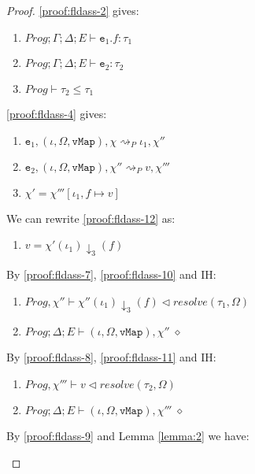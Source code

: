 \begin{proof}
\ref{proof:fldass-2} gives:
\begin{enumerate}[label=\arabic*), resume]
    \item \label{proof:fldass-7} $Prog; \Gamma; \Delta; E \vdash \texttt{e}_1.f : \tau_1$
    \item \label{proof:fldass-8} $Prog; \Gamma; \Delta; E \vdash \texttt{e}_2 : \tau_2$
    \item \label{proof:fldass-9} $Prog \vdash \tau_2 \leq \tau_1$
\end{enumerate}
\ref{proof:fldass-4} gives:
\begin{enumerate}[label=\arabic*), resume]
    \item \label{proof:fldass-10} $\texttt{e}_1, (\iota, \Omega, \texttt{vMap}), \chi \rightsquigarrow_P \iota_1, \chi''$
    \item \label{proof:fldass-11} $\texttt{e}_2, (\iota, \Omega, \texttt{vMap}), \chi'' \rightsquigarrow_P v, \chi'''$
    \item \label{proof:fldass-12} $\chi' = \chi'''[\iota_1, f \mapsto v]$
\end{enumerate}
We can rewrite \ref{proof:fldass-12} as:
\begin{enumerate}[label=\arabic*), resume]
    \item \label{proof:fldass-13} $v = \chi'(\iota_1)\downarrow_3(f)$
\end{enumerate}
By \ref{proof:fldass-7}, \ref{proof:fldass-10} and IH:
\begin{enumerate}[label=\arabic*), resume]
    \item \label{proof:fldass-14} $Prog, \chi'' \vdash \chi''(\iota_1)\downarrow_3(f) \triangleleft resolve(\tau_1, \Omega)$
    \item \label{proof:fldass-15} $Prog; \Delta; E \vdash (\iota, \Omega, \texttt{vMap}), \chi'' \; \diamond$
\end{enumerate}
By \ref{proof:fldass-8}, \ref{proof:fldass-11} and IH:
\begin{enumerate}[label=\arabic*), resume]
    \item \label{proof:fldass-16} $Prog, \chi''' \vdash v \triangleleft resolve(\tau_2, \Omega)$
    \item \label{proof:fldass-17} $Prog; \Delta; E \vdash (\iota, \Omega, \texttt{vMap}), \chi''' \; \diamond$
\end{enumerate}
By \ref{proof:fldass-9} and Lemma \ref{lemma:2} we have:
\begin{enumerate}[label=\arabic*), resume]

\end{enumerate}
\end{proof}
